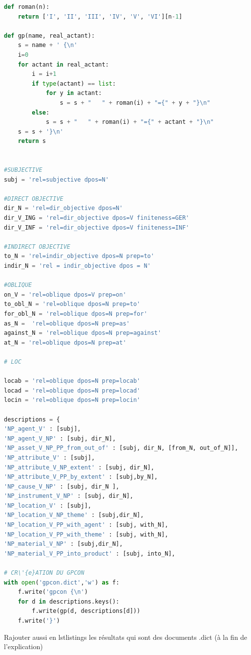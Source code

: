 \begin{lstlisting}[language=Python, caption = code pour gpcon.dict]
def roman(n):
    return ['I', 'II', 'III', 'IV', 'V', 'VI'][n-1]
		
def gp(name, real_actant):
    s = name + ' {\n'
    i=0
    for actant in real_actant:
        i = i+1
        if type(actant) == list:
            for y in actant:
                s = s + "   " + roman(i) + "={" + y + "}\n"
        else:
            s = s + "   " + roman(i) + "={" + actant + "}\n"
    s = s + '}\n'
    return s


#SUBJECTIVE
subj = 'rel=subjective dpos=N'

#DIRECT OBJECTIVE
dir_N = 'rel=dir_objective dpos=N'
dir_V_ING = 'rel=dir_objective dpos=V finiteness=GER'
dir_V_INF = 'rel=dir_objective dpos=V finiteness=INF'

#INDIRECT OBJECTIVE
to_N = 'rel=indir_objective dpos=N prep=to'
indir_N = 'rel = indir_objective dpos = N'

#OBLIQUE
on_V = 'rel=oblique dpos=V prep=on'
to_obl_N = 'rel=oblique dpos=N prep=to' 
for_obl_N = 'rel=oblique dpos=N prep=for'
as_N =  'rel=oblique dpos=N prep=as'
against_N = 'rel=oblique dpos=N prep=against'
at_N = 'rel=oblique dpos=N prep=at'

# LOC

locab = 'rel=oblique dpos=N prep=locab'
locad = 'rel=oblique dpos=N prep=locad'
locin = 'rel=oblique dpos=N prep=locin'

descriptions = {
'NP_agent_V' : [subj],
'NP_agent_V_NP' : [subj, dir_N],
'NP_asset_V_NP_PP_from_out_of' : [subj, dir_N, [from_N, out_of_N]],
'NP_attribute_V' : [subj],
'NP_attribute_V_NP_extent' : [subj, dir_N],
'NP_attribute_V_PP_by_extent' : [subj,by_N],
'NP_cause_V_NP' : [subj, dir_N ],
'NP_instrument_V_NP' : [subj, dir_N],
'NP_location_V' : [subj],
'NP_location_V_NP_theme' : [subj,dir_N],
'NP_location_V_PP_with_agent' : [subj, with_N],
'NP_location_V_PP_with_theme' : [subj, with_N],
'NP_material_V_NP' : [subj,dir_N],
'NP_material_V_PP_into_product' : [subj, into_N],

# CR\'{e}ATION DU GPCON
with open('gpcon.dict','w') as f:
    f.write('gpcon {\n')
    for d in descriptions.keys():
        f.write(gp(d, descriptions[d]))
    f.write('}')

\end{lstlisting}

Rajouter aussi en lstlistings les résultats qui sont des documents .dict (à la fin de l'explication)

